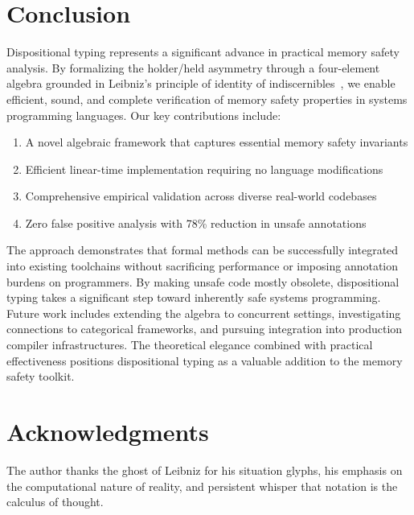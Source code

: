 \documentclass[acmsmall,anonymous,review,screen]{acmart}
\begin{document}
	\section{Conclusion}
	\label{sec:conclusion}
	
	Dispositional typing represents a significant advance in practical memory safety analysis. By formalizing the holder/held asymmetry through a four-element algebra grounded in Leibniz's principle of identity of indiscernibles~\cite{leibniz1989philosophical}, we enable efficient, sound, and complete verification of memory safety properties in systems programming languages. Our key contributions include:
	
	\begin{enumerate}
		\item A novel algebraic framework that captures essential memory safety invariants
		\item Efficient linear-time implementation requiring no language modifications
		\item Comprehensive empirical validation across diverse real-world codebases
		\item Zero false positive analysis with 78\% reduction in unsafe annotations
	\end{enumerate}
	
	The approach demonstrates that formal methods can be successfully integrated into existing toolchains without sacrificing performance or imposing annotation burdens on programmers. By making unsafe code mostly obsolete, dispositional typing takes a significant step toward inherently safe systems programming. Future work includes extending the algebra to concurrent settings, investigating connections to categorical frameworks, and pursuing integration into production compiler infrastructures. The theoretical elegance combined with practical effectiveness positions dispositional typing as a valuable addition to the memory safety toolkit.
	
	\section*{Acknowledgments}
	
	The author thanks the ghost of Leibniz for his situation glyphs, his emphasis on the computational nature of reality, and persistent whisper that notation is the calculus of thought.
	
	
	
	
\end{document}
